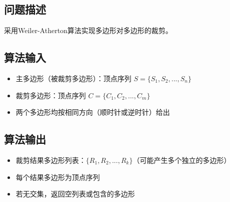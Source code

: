 \documentclass[12pt,a4paper]{article}
\begin{document}
\subsection{问题描述}
采用Weiler-Atherton算法实现多边形对多边形的裁剪。

\subsection{算法输入}
\begin{itemize}
    \item 主多边形（被裁剪多边形）：顶点序列 $S = \{S_1, S_2, ..., S_n\}$
    \item 裁剪多边形：顶点序列 $C = \{C_1, C_2, ..., C_m\}$
    \item 两个多边形均按相同方向（顺时针或逆时针）给出
\end{itemize}

\subsection{算法输出}
\begin{itemize}
    \item 裁剪结果多边形列表：$\{R_1, R_2, ..., R_k\}$（可能产生多个独立的多边形）
    \item 每个结果多边形为顶点序列
    \item 若无交集，返回空列表或包含的多边形
\end{itemize}
\end{document}
